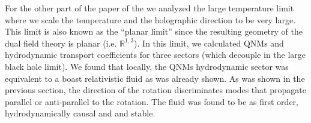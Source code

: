\documentclass[12pt]{article}
\begin{document}
For the other part of the paper of the we analyzed the large temperature limit where we scale the temperature and the holographic direction to be very large.
%
This limit is also known as the ``planar limit'' since the resulting geometry of the dual field theory is planar (i.e. $\mathds{R}^{1,3}$). 
%
In this limit, we calculated QNMs and hydrodynamic transport coefficients for three sectors (which decouple in the large black hole limit).
%
We found that locally, the QNMs hydrodynamic sector was equivalent to a boast relativistic fluid as was already shown.
%
As was shown in the previous section, the direction of the rotation discriminates modes that propagate parallel or anti-parallel to the rotation.
%
The fluid was found to be as first order, hydrodynamically causal and and stable.
\end{document}
